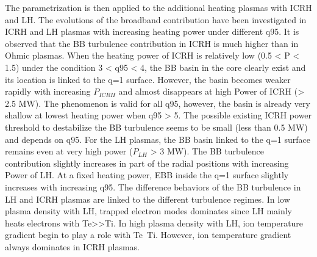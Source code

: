 The parametrization is then applied to the additional heating plasmas with ICRH and LH. The evolutions of the broadband contribution have been investigated in ICRH and LH plasmas with increasing heating power under different q95. It is observed that the BB turbulence contribution in ICRH is much higher than in Ohmic plasmas. When the heating power of ICRH is relatively low (0.5 < P < 1.5) under the condition 3 < q95 < 4, the BB basin in the core clearly exist and its location is linked to the q=1 surface. However, the basin becomes weaker rapidly with increasing $P_{ICRH}$ and almost disappears at high Power of ICRH (> 2.5 MW). The phenomenon is valid for all q95, however, the basin is already very shallow at lowest heating power when q95 > 5. The possible existing ICRH power threshold to destabilize the BB turbulence seems to be small (less than 0.5 MW) and depends on q95. For the LH plasmas, the BB basin linked to the q=1 surface remains even at very high power ($P_{LH}$ > 3 MW). The BB turbulence contribution slightly increases in part of the radial positions with increasing Power of LH. At a fixed heating power, EBB inside the q=1 surface slightly increases with increasing q95. The difference behaviors of the BB turbulence in LH and ICRH plasmas are linked to the different turbulence regimes. In low plasma density with LH, trapped electron modes dominates since LH mainly heats electrons with Te>>Ti. In high plasma density with LH, ion temperature gradient begin to play a role with Te~Ti. However, ion temperature gradient always dominates in ICRH plasmas. 